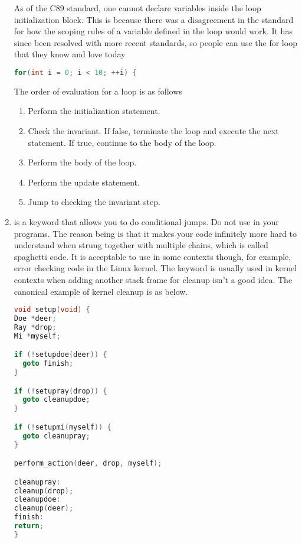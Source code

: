 \begin{enumerate}
	      As of the C89 standard, one cannot declare variables inside the  loop initialization block.
        This is because there was a disagreement in the standard for how the scoping rules of a variable defined in the loop would work.
        It has since been resolved with more recent standards, so people can use the for loop that they know and love today

\begin{lstlisting}[language=C]
for(int i = 0; i < 10; ++i) {
\end{lstlisting}

	      The order of evaluation for a  loop is as follows

	      \begin{enumerate}
		      \item Perform the initialization statement.
		      \item Check the invariant. If false, terminate the loop and execute the next statement. If true, continue to the body of the loop.
		      \item Perform the body of the loop.
		      \item Perform the update statement.
		      \item Jump to checking the invariant step.
	      \end{enumerate}

	    \item {} is a keyword that allows you to do conditional jumps.
        Do not use  in your programs.
        The reason being is that it makes your code infinitely more hard to understand when strung together with multiple chains, which is called spaghetti code.
        It is acceptable to use in some contexts though, for example, error checking code in the Linux kernel.
        The keyword is usually used in kernel contexts when adding another stack frame for cleanup isn't a good idea.
        The canonical example of kernel cleanup is as below.

\begin{lstlisting}[language=C]
void setup(void) {
Doe *deer;
Ray *drop;
Mi *myself;

if (!setupdoe(deer)) {
  goto finish;
}

if (!setupray(drop)) {
  goto cleanupdoe;
}

if (!setupmi(myself)) {
  goto cleanupray;
}

perform_action(deer, drop, myself);

cleanupray:
cleanup(drop);
cleanupdoe:
cleanup(deer);
finish:
return;
}
\end{lstlisting}


\end{enumerate}
